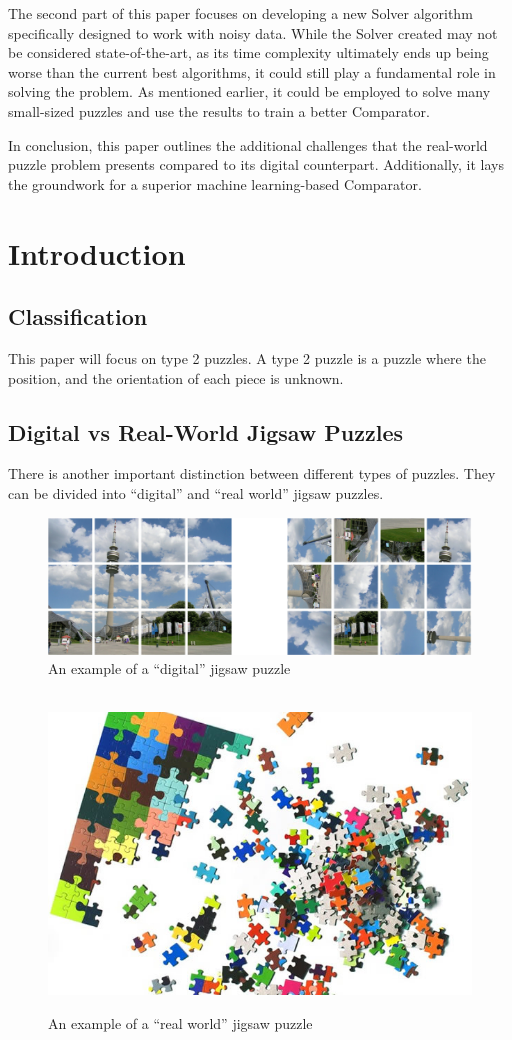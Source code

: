 \documentclass{article}
\begin{document}
The second part of this paper focuses on developing a
new Solver algorithm specifically designed to work with noisy data.
While the Solver created may not be considered state-of-the-art,
as its time complexity ultimately ends up being worse than the current
best algorithms, it could still play a fundamental role in solving the problem.
As mentioned earlier, it could be employed to solve many small-sized
puzzles and use the results to train a better Comparator.

In conclusion, this paper outlines the additional challenges that the real-world
puzzle problem presents compared to its digital counterpart.
Additionally, it lays the groundwork for a superior machine learning-based Comparator.

\section{Introduction}
\subsection{Classification}
This paper will focus on type 2 puzzles. A type 2 puzzle is a puzzle where the position, and the orientation of each piece is unknown. 
\subsection{Digital vs Real-World Jigsaw Puzzles}

There is  another important distinction between different types of puzzles.
They can be divided into “digital” and “real world” jigsaw puzzles.\label{document:DigitalVSReal}

\begin{figure}[H]
    \caption{An example of a “digital” jigsaw  puzzle}\label{fig:figure_digital_puzzle}
    \centering
    \includegraphics[height=0.25\textwidth]{pictures/digital_puzzle.png}
\end{figure}

\begin{figure}[H]
    \caption{An example of a ``real world'' jigsaw  puzzle}~\label{fig:figure_real_puzzle}
    \includegraphics[height=0.25\textwidth]{pictures/real_puzzle.jpg}
    \centering

\end{figure}
\end{document}
